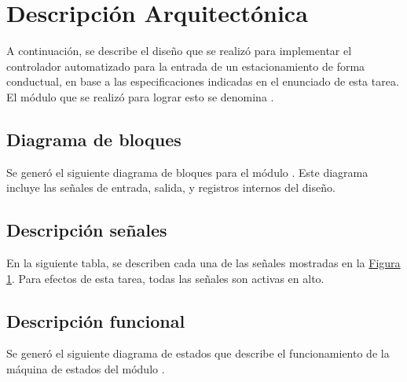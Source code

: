 \section{Descripción Arquitectónica}
A continuación, se describe el diseño que se realizó para implementar el controlador automatizado para la entrada de un estacionamiento de forma conductual, en base a las especificaciones indicadas en el enunciado de esta tarea.
El módulo que se realizó para lograr esto se denomina .
\subsection{Diagrama de bloques}
Se generó el siguiente diagrama de bloques para el módulo . 
Este diagrama incluye las señales de entrada, salida, y registros internos del diseño. 



\newpage

\subsection{Descripción señales}
En la siguiente tabla, se describen cada una de las señales mostradas en la \hyperref[fig1]{Figura 1}.
Para efectos de esta tarea, todas las señales son activas en alto.



\newpage

\subsection{Descripción funcional}
Se generó el siguiente diagrama de estados que describe el funcionamiento de la máquina de estados del módulo .



